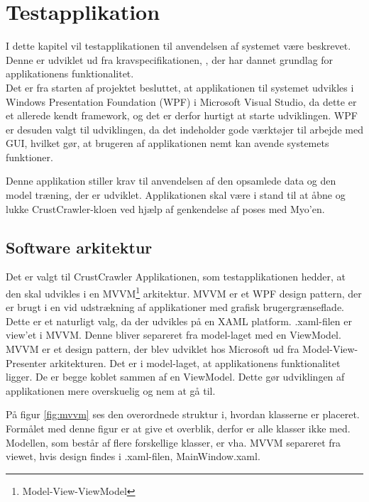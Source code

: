 \thispagestyle{fancy}
\chapter{Testapplikation}
\label{chp:testapp}
I dette kapitel vil testapplikationen til anvendelsen af systemet være beskrevet. Denne er udviklet ud fra kravspecifikationen, \citep{RefWorks:8}, der har dannet grundlag for applikationens funktionalitet. \\
Det er fra starten af projektet besluttet, at applikationen til systemet udvikles i Windows Presentation Foundation (WPF) i Microsoft Visual Studio, da dette er et allerede kendt framework, og det er derfor hurtigt at starte udviklingen. WPF er desuden valgt til udviklingen, da det indeholder gode værktøjer til arbejde med GUI, hvilket gør, at brugeren af applikationen nemt kan avende systemets funktioner.

Denne applikation stiller krav til anvendelsen af den opsamlede data og den model træning, der er udviklet. Applikationen skal være i stand til at åbne og lukke CrustCrawler-kloen ved hjælp af genkendelse af poses med Myo'en.

\section{Software arkitektur}
Det er valgt til CrustCrawler Applikationen, som testapplikationen hedder, at den skal udvikles i en MVVM\footnote{Model-View-ViewModel} arkitektur\citep{RefWorks:14}. MVVM er et WPF design pattern, der er brugt i en vid udstrækning af applikationer med grafisk brugergrænseflade. Dette er et naturligt valg, da der udvikles på en XAML platform. .xaml-filen er view'et i MVVM. Denne bliver separeret fra model-laget med en ViewModel. MVVM er et design pattern, der blev udviklet hos Microsoft ud fra Model-View-Presenter arkitekturen\citep{mvp}. Det er i model-laget, at applikationens funktionalitet ligger. De er begge koblet sammen af en ViewModel. Dette gør udviklingen af applikationen mere overskuelig og nem at gå til.


På figur \ref{fig:mvvm} ses den overordnede struktur i, hvordan klasserne er placeret. Formålet med denne figur er at give et overblik, derfor er alle klasser ikke med. Modellen, som består af flere forskellige klasser, er vha. MVVM separeret fra viewet, hvis design findes i .xaml-filen, MainWindow.xaml.

